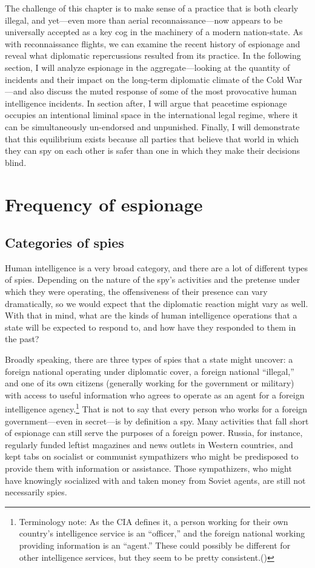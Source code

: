 \documentclass{memoir}
\begin{document}
\begin{refsegment}
The challenge of this chapter is to make sense of a practice that is both clearly illegal, and yet---even more than aerial reconnaissance---now appears to be universally accepted as a key cog in the machinery of a modern nation-state. As with reconnaissance flights, we can examine the recent history of espionage and reveal what diplomatic repercussions resulted from its practice. In the following section, I will analyze espionage in the aggregate---looking at the quantity of incidents and their impact on the long-term diplomatic climate of the Cold War---and also discuss the muted response of some of the most provocative human intelligence incidents. In section after, I will argue that peacetime espionage occupies an intentional liminal space in the international legal regime, where it can be simultaneously un-endorsed and unpunished. Finally, I will demonstrate that this equilibrium exists because all parties that believe that world in which they can spy on each other is safer than one in which they make their decisions blind.

\section{Frequency of espionage}
\subsection{Categories of spies}
Human intelligence is a very broad category, and there are a lot of different types of spies. Depending on the nature of the spy's activities and the pretense under which they were operating, the offensiveness of their presence can vary dramatically, so we would expect that the diplomatic reaction might vary as well. With that in mind, what are the kinds of human intelligence operations that a state will be expected to respond to, and how have they responded to them in the past?

Broadly speaking, there are three types of spies that a state might uncover: a foreign national operating under diplomatic cover, a foreign national ``illegal,'' and one of its own citizens (generally working for the government or military) with access to useful information who agrees to operate as an agent for a foreign intelligence agency.\footnote{Terminology note: As the CIA defines it, a person working for their own country's intelligence service is an ``officer,'' and the foreign national working providing information is an ``agent.'' These could possibly be different for other intelligence services, but they seem to be pretty consistent.(\cite{cia_insider_2019})} That is not to say that every person who works for a foreign government---even in secret---is by definition a spy. Many activities that fall short of espionage can still serve the purposes of a foreign power. Russia, for instance, regularly funded leftist magazines and news outlets in Western countries, and kept tabs on socialist or communist sympathizers who might be predisposed to provide them with information or assistance. Those sympathizers, who might have knowingly socialized with and taken money from Soviet agents, are still not necessarily spies.


\end{refsegment}
\end{document}
